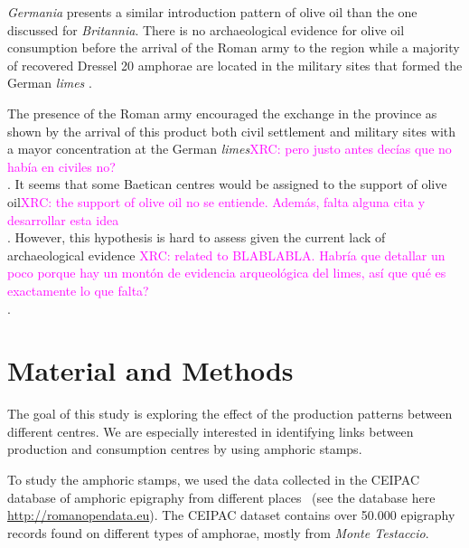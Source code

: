 \documentclass[review]{elsarticle}
\newcommand{\memo}[2]{\textcolor{#1}{#2}}
\newcommand{\xavi}[1]{\memo{magenta}{XRC: #1\\}}
\begin{document}
\textit{Germania} presents a similar introduction pattern of olive oil than the one discussed for \textit{Britannia}. There is no archaeological evidence for olive oil consumption before the arrival of the Roman army to the region while a majority of recovered Dressel 20 amphorae are located in the military sites that formed the German \textit{limes} \citep{remesal_germaniaengl_2002}.


The presence of the Roman army encouraged the exchange in the province as shown by the arrival of this product both civil settlement and military sites with a mayor concentration at the German \textit{limes}\xavi{pero justo antes decías que no había en civiles no?}. It seems that some Baetican centres would be assigned to the support of olive oil\xavi{the support of olive oil no se entiende. Además, falta alguna cita y desarrollar esta idea}. However, this hypothesis is hard to assess given the current lack of archaeological evidence \xavi{related to BLABLABLA. Habría que detallar un poco porque hay un montón de evidencia arqueológica del limes, así que qué es exactamente lo que falta?}\citep[125]{remesal_concierto}. 



\section{Material and Methods}


The goal of this study is exploring the effect of the production patterns between different centres. We are especially interested in identifying links between production and consumption centres by using amphoric stamps. 


To study the amphoric stamps, we used the data collected in the CEIPAC database of amphoric epigraphy from different places~\citep{remesal_centro_2015} (see the database here \url{http://romanopendata.eu}). The CEIPAC dataset contains over 50.000 epigraphy records found on different types of amphorae, mostly from \textit{Monte Testaccio}. 

\end{document}
